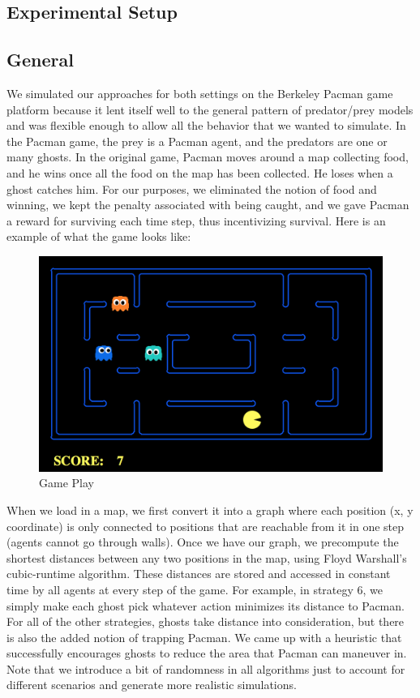\documentclass[11pt]{article}
\begin{document}
\begin{multicols}{2}
\section{Experimental Setup}
\subsection{General}
We simulated our approaches for both settings on the Berkeley Pacman game platform because it lent itself well to the general pattern of predator/prey models and was flexible enough to allow all the behavior that we wanted to simulate. In the Pacman game, the prey is a Pacman agent, and the predators are one or many ghosts. In the original game, Pacman moves around a map collecting food, and he wins once all the food on the map has been collected. He loses when a ghost catches him. For our purposes, we eliminated the notion of food and winning, we kept the penalty associated with being caught, and we gave Pacman a reward for surviving each time step, thus incentivizing survival. Here is an example of what the game looks like: \\

\begin{figure}[H]
	\includegraphics[width=\columnwidth]{examplemap.png}
	\caption{Game Play}
	\label{fig:gameplay}
\end{figure}

When we load in a map, we first convert it into a graph where each position (x, y coordinate) is only connected to positions that are reachable from it in one step (agents cannot go through walls). Once we have our graph, we precompute the shortest distances between any two positions in the map, using Floyd Warshall's cubic-runtime algorithm. These distances are stored and accessed in constant time by all agents at every step of the game. For example, in strategy 6, we simply make each ghost pick whatever action minimizes its distance to Pacman. For all of the other strategies, ghosts take distance into consideration, but there is also the added notion of trapping Pacman. We came up with a heuristic that successfully encourages ghosts to reduce the area that Pacman can maneuver in. Note that we introduce a bit of randomness in all algorithms just to account for different scenarios and generate more realistic simulations.


\end{multicols}
\end{document}
